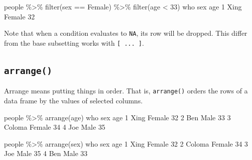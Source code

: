 \documentclass[
]{book}
\newenvironment{Shaded}{\begin{snugshade}}{\end{snugshade}}
\newcommand{\DecValTok}[1]{\textcolor[rgb]{0.00,0.00,0.81}{#1}}
\newcommand{\FunctionTok}[1]{\textcolor[rgb]{0.00,0.00,0.00}{#1}}
\newcommand{\NormalTok}[1]{#1}
\newcommand{\SpecialCharTok}[1]{\textcolor[rgb]{0.00,0.00,0.00}{#1}}
\newcommand{\StringTok}[1]{\textcolor[rgb]{0.31,0.60,0.02}{#1}}
\begin{document}
\begin{Shaded}
\begin{Highlighting}[]
\NormalTok{people }\SpecialCharTok{\%\textgreater{}\%} \FunctionTok{filter}\NormalTok{(sex }\SpecialCharTok{==} \StringTok{\textquotesingle{}Female\textquotesingle{}}\NormalTok{) }\SpecialCharTok{\%\textgreater{}\%} \FunctionTok{filter}\NormalTok{(age }\SpecialCharTok{\textless{}} \DecValTok{33}\NormalTok{)}
\NormalTok{   who    sex age}
\DecValTok{1}\NormalTok{ Xing Female  }\DecValTok{32}
\end{Highlighting}
\end{Shaded}

Note that when a condition evaluates to \texttt{NA}, its row will be dropped. This differ from the base subsetting works with \texttt{{[}\ ...\ {]}}.

\hypertarget{arrange}{%
\subsection*{\texorpdfstring{\texttt{arrange()}}{arrange()}}\label{arrange}}

Arrange means putting things in order. That is, \texttt{arrange()} orders the rows of a data frame by the values of selected columns.

\begin{Shaded}
\begin{Highlighting}[]
\NormalTok{people }\SpecialCharTok{\%\textgreater{}\%} \FunctionTok{arrange}\NormalTok{(age)}
\NormalTok{     who    sex age}
\DecValTok{1}\NormalTok{   Xing Female  }\DecValTok{32}
\DecValTok{2}\NormalTok{    Ben   Male  }\DecValTok{33}
\DecValTok{3}\NormalTok{ Coloma Female  }\DecValTok{34}
\DecValTok{4}\NormalTok{    Joe   Male  }\DecValTok{35}
\end{Highlighting}
\end{Shaded}

\begin{Shaded}
\begin{Highlighting}[]
\NormalTok{people }\SpecialCharTok{\%\textgreater{}\%} \FunctionTok{arrange}\NormalTok{(sex)}
\NormalTok{     who    sex age}
\DecValTok{1}\NormalTok{   Xing Female  }\DecValTok{32}
\DecValTok{2}\NormalTok{ Coloma Female  }\DecValTok{34}
\DecValTok{3}\NormalTok{    Joe   Male  }\DecValTok{35}
\DecValTok{4}\NormalTok{    Ben   Male  }\DecValTok{33}
\end{Highlighting}
\end{Shaded}
\end{document}

